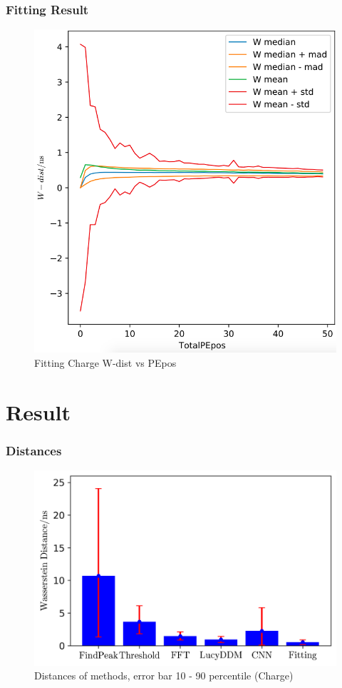 \documentclass{beamer}
\begin{document}
\begin{frame}
\frametitle{Fitting Result}
\setlength{\abovecaptionskip}{0mm}
\setlength{\belowcaptionskip}{0mm}
\begin{figure}
    \centering
    \caption{Fitting Charge W-dist vs PEpos}
    \includegraphics[width=0.65\linewidth]{img/xiaopeipchargestats.png}
\end{figure}
\end{frame}

\section{Result}
\begin{frame}
\frametitle{Distances}
\begin{figure}
    \centering
    \caption{Distances of methods, error bar 10 - 90 percentile (Charge)}
    \includegraphics[width=1.0\linewidth]{img/summarycharge.png}
\end{figure}
\end{frame}
\end{document}
